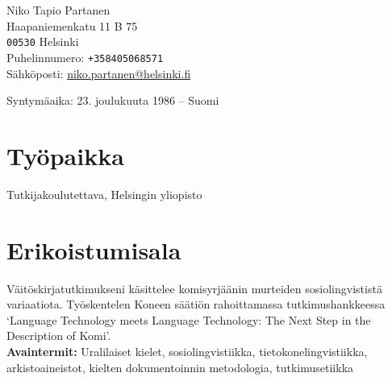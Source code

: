 \documentclass[11pt, a4paper]{article}
\begin{document}

{\LARGE Niko Tapio Partanen}\\[1cm] %
Haapaniemenkatu 11 B 75\\
\texttt{00530} Helsinki\\[.2cm]
Puhelinnumero: \texttt{+358405068571}\\ %
Sähköposti: \href{mailto:niko.partanen@kotus.fi}{niko.partanen@helsinki.fi}\\ %

\vspace{10mm}

Syntymäaika: 23. joulukuuta 1986 – Suomi\\ %


\section*{Työpaikka}

Tutkijakoulutettava, Helsingin yliopisto %

\section*{Erikoistumisala}

Väitöskirjatutkimukseni käsittelee komisyrjäänin murteiden sosiolingvististä variaatiota. Työskentelen Koneen säätiön rahoittamassa tutkimushankkeessa `Language Technology meets Language Technology: The Next Step in the Description of Komi'.\\

\textbf{Avaintermit:} Uralilaiset kielet, sosiolingvistiikka, tietokonelingvistiikka, arkistoaineistot, kielten dokumentoinnin metodologia, tutkimusetiikka %

\end{document}
